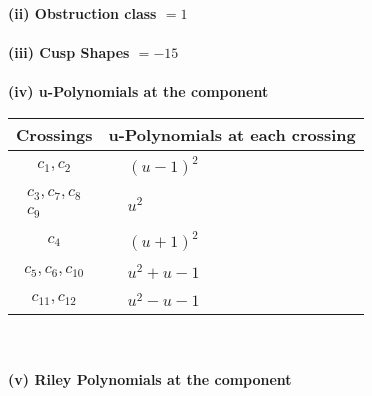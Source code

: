 \documentclass[1p]{elsarticle_modified}
\theoremstyle{definition}
\begin{document}
\flushleft \textbf{(ii) Obstruction class $= 1$}\\~\\
\flushleft \textbf{(iii) Cusp Shapes $= -15$}\\~\\
\newpage\renewcommand{\arraystretch}{1}
\flushleft \textbf{(iv) u-Polynomials at the component}\newline \\
\begin{tabular}{m{50pt}|m{274pt}}
Crossings & \hspace{64pt}u-Polynomials at each crossing \\
\hline $$\begin{aligned}c_{1},c_{2}\end{aligned}$$&$\begin{aligned}
&(u-1)^2
\end{aligned}$\\
\hline $$\begin{aligned}c_{3},c_{7},c_{8}\\c_{9}\end{aligned}$$&$\begin{aligned}
&u^2
\end{aligned}$\\
\hline $$\begin{aligned}c_{4}\end{aligned}$$&$\begin{aligned}
&(u+1)^2
\end{aligned}$\\
\hline $$\begin{aligned}c_{5},c_{6},c_{10}\end{aligned}$$&$\begin{aligned}
&u^2+u-1
\end{aligned}$\\
\hline $$\begin{aligned}c_{11},c_{12}\end{aligned}$$&$\begin{aligned}
&u^2- u-1
\end{aligned}$\\
\hline
\end{tabular}\\~\\
\newpage\renewcommand{\arraystretch}{1}
\flushleft \textbf{(v) Riley Polynomials at the component}\newline \\
\end{document}
